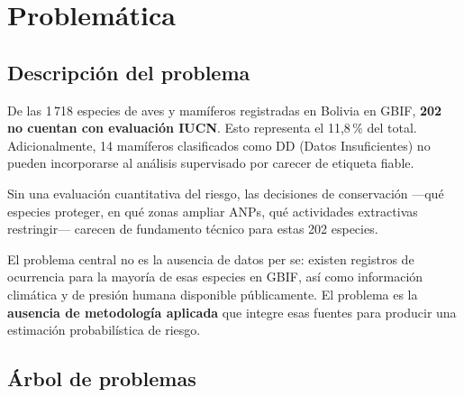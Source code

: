 \documentclass[12pt,a4paper]{article}
\begin{document}
\section{Problemática}

\subsection{Descripción del problema}

De las 1\,718 especies de aves y mamíferos registradas en Bolivia en GBIF,
\textbf{202 no cuentan con evaluación IUCN}.  Esto representa el 11,8\,\% del total.
Adicionalmente, 14 mamíferos clasificados como DD (Datos Insuficientes) no pueden
incorporarse al análisis supervisado por carecer de etiqueta fiable.

Sin una evaluación cuantitativa del riesgo, las decisiones de conservación ---qué
especies proteger, en qué zonas ampliar ANPs, qué actividades extractivas restringir---
carecen de fundamento técnico para estas 202 especies.

El problema central no es la ausencia de datos per se: existen registros de ocurrencia
para la mayoría de esas especies en GBIF, así como información climática y de presión
humana disponible públicamente.  El problema es la \textbf{ausencia de metodología aplicada}
que integre esas fuentes para producir una estimación probabilística de riesgo.

\subsection{Árbol de problemas}
\end{document}
